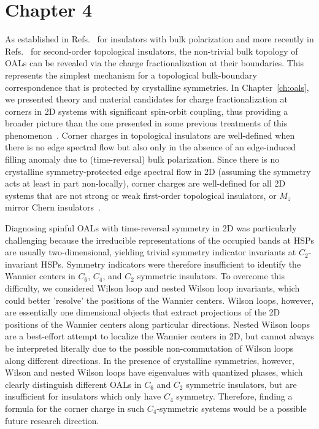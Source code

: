 \section*{Chapter 4}
\noindent As established in Refs.~\cite{Miert16,miertOrtixFractionalCharge17,rhim17} for insulators with bulk polarization and more recently in Refs.~\cite{miertcorners,benalcazar2018quantization} for second-order topological insulators, the non-trivial bulk topology of OALs can be revealed via the charge fractionalization at their boundaries. This represents the simplest mechanism for a topological bulk-boundary correspondence that is protected by crystalline symmetries. In Chapter~\ref{ch:oals}, we presented theory and material candidates for charge fractionalization at corners in 2D systems with significant spin-orbit coupling, thus providing a broader picture than the one presented in some previous treatments of this phenomenon~\cite{miertcorners,EzawaWannier19,benalcazar2018quantization}. Corner charges in topological insulators are well-defined when there is no edge spectral flow but also only in the absence of an edge-induced filling anomaly due to (time-reversal) bulk polarization. Since there is no crystalline symmetry-protected edge spectral flow in 2D (assuming the symmetry acts at least in part non-locally), corner charges are well-defined for all 2D systems that are not strong or weak first-order topological insulators, or $M_z$ mirror Chern insulators~\cite{FuTCI2011,tcirev}.

Diagnosing spinful OALs with time-reversal symmetry in 2D was particularly challenging because the irreducible representations of the occupied bands at HSPs are usually two-dimensional, yielding trivial symmetry indicator invariants at $C_2$-invariant HSPs. Symmetry indicators were therefore insufficient to identify the Wannier centers in $C_6$, $C_4$, and $C_2$ symmetric insulators. To overcome this difficulty, we considered Wilson loop and nested Wilson loop invariants, which could better 'resolve' the positions of the Wannier centers. Wilson loops, however, are essentially one dimensional objects that extract projections of the 2D positions of the Wannier centers along particular directions. Nested Wilson loops are a best-effort attempt to localize the Wannier centers in 2D, but cannot always be interpreted literally due to the possible non-commutation of Wilson loops along different directions. In the presence of crystalline symmetries, however, Wilson and nested Wilson loops have eigenvalues with quantized phases, which clearly distinguish different OALs in $C_6$ and $C_2$ symmetric insulators, but are insufficient for insulators which only have $C_4$ symmetry. Therefore, finding a formula for the corner charge in such $C_4$-symmetric systems would be a possible future research direction.

